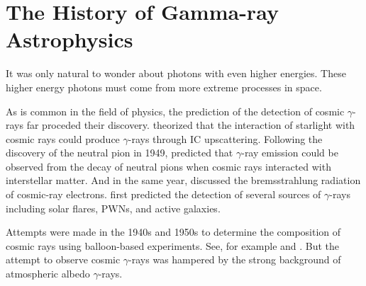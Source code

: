 
\section{The History of Gamma-ray Astrophysics}

It was only natural to wonder about photons with even
higher energies. These higher energy photons must
come from more extreme processes in space.

As is common in the field of physics, the prediction of
the detection of cosmic $\gamma$-rays far proceded their discovery.
\cite{feenberg_1948_interaction-cosmic-ray} theorized that the interaction
of starlight with cosmic rays could produce $\gamma$-rays through
\ac{IC} upscattering.  Following the discovery of the neutral
pion in 1949, \cite{hayakawa_1952_propagation-cosmic}
predicted that $\gamma$-ray emission could be observed from the
decay of neutral pions when cosmic rays interacted with interstellar
matter.  And in the same year, \cite{hutchinson_1952_possible-relation}
discussed the bremsstrahlung radiation of cosmic-ray electrons.
\cite{morrison_1958_gamma-ray-astronomy} first predicted the detection
of several sources of $\gamma$-rays including solar flares, \acp{PWN},
and active galaxies.

    

Attempts were made in the 1940s and 1950s to determine the
composition of cosmic rays using balloon-based experiments. See,
for example \cite{critchfield_1952_radiation-balloon} and
\cite{hulsizer_1948_search-electrons}.  But the attempt to observe
cosmic $\gamma$-rays was hampered by the strong background of atmospheric
albedo $\gamma$-rays.




